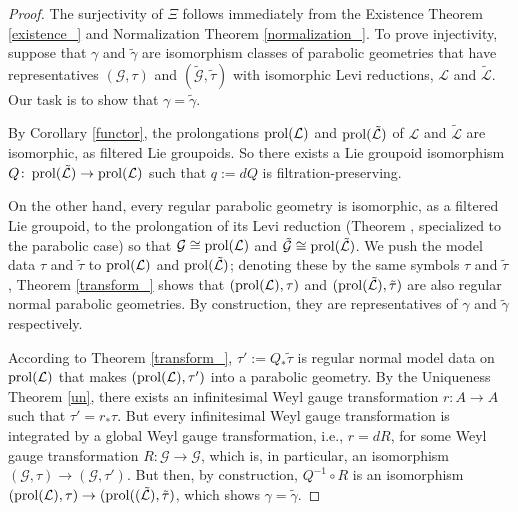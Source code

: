 \documentclass[leqno,12pt]{amsart} %
\begin{document}
\begin{proof}
  The surjectivity of $\Xi$ follows immediately from the Existence Theorem
  \ref{existence_} and Normalization Theorem \ref{normalization_}. To prove injectivity,
  suppose that $\gamma$ and $\tilde \gamma$ are isomorphism classes of parabolic
  geometries that have representatives $({\mathcal G}, \tau)$ and
  $(\tilde{\mathcal G}, \tilde \tau)$ with isomorphic Levi reductions, ${\mathcal L}$ and
  $\tilde {\mathcal L}$. Our task is to show that $\gamma = \tilde \gamma $.

  By Corollary \ref{functor}, the prolongations $\operatorname{prol} ({\mathcal L})$ and
  $\operatorname{prol} (\tilde {\mathcal L})$ of ${\mathcal L}$ and $\tilde {\mathcal L}$ are
  isomorphic, as filtered Lie groupoids. So there exists a Lie groupoid isomorphism
  $Q \colon \operatorname{prol}(\tilde {\mathcal L}) \rightarrow \operatorname{prol}({\mathcal L})$
  such that $q:=dQ$ is filtration-preserving.

  On the other hand, every regular parabolic geometry is isomorphic, as a filtered Lie
  groupoid, to the prolongation of its Levi reduction (Theorem ,
  specialized to the parabolic case) so that
  ${\mathcal G} \cong \operatorname{prol}( {\mathcal L})$ and
  $\tilde {\mathcal G} \cong \operatorname{prol}( \tilde {\mathcal L})$. We push the model data
  $\tau $ and $\tilde \tau $ to $\operatorname{prol}({\mathcal L})$ and
  $\operatorname{prol}(\tilde {\mathcal L})$; denoting these by the same symbols $\tau $ and
  $\tilde \tau$, Theorem \ref{transform_} shows that
  $(\operatorname{prol}( {\mathcal L}), \tau)$ and
  $(\operatorname{prol}( \tilde {\mathcal L}), \tilde \tau)$ are also regular normal parabolic
  geometries. By construction, they are representatives of $\gamma $ and $\tilde \gamma $
  respectively.

  According to Theorem \ref{transform_}, $\tau' := Q_* \tilde \tau $ is regular normal
  model data on $\operatorname{prol}({\mathcal L})$ that makes
  $(\operatorname{prol}({\mathcal L}), \tau')$ into a parabolic geometry. By the Uniqueness
  Theorem \ref{un}, there exists an infinitesimal Weyl gauge transformation
  $r \colon A \rightarrow A$ such that $\tau' = r_*\tau$. But every infinitesimal Weyl
  gauge transformation is integrated by a global Weyl gauge transformation, i.e.,
  $r = dR$, for some Weyl gauge transformation
  $R \colon {\mathcal G} \rightarrow {\mathcal G} $, which is, in particular, an
  isomorphism $({\mathcal G}, \tau) \rightarrow ({\mathcal G}, \tau')$. But then, by
  construction, $Q^{-1} \circ R$ is an isomorphism
  $(\operatorname{prol}({\mathcal L}), \tau) \rightarrow (\operatorname{prol}((\tilde {\mathcal L}),
  \tilde \tau)$, which shows $\gamma = \tilde \gamma $.

\end{proof}
\end{document}
